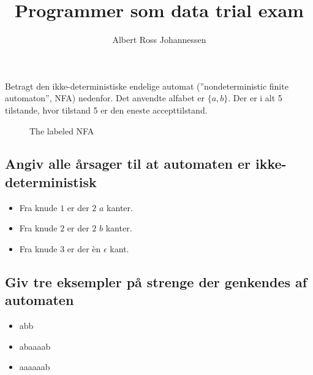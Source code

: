 \documentclass[11pt,a4paper]{article}
\begin{document}
\begin{titlepage}
  \title{Programmer som data trial exam}
  \author{Albert Ross Johannessen}
  \maketitle
  \newpage
  \thispagestyle{empty}
  \newpage
\end{titlepage}

\pagestyle{fancy}
\fancyhf{}
\newpage
\section{}
Betragt den ikke-deterministiske endelige automat (''nondeterministic finite automaton'', NFA) nedenfor. Det anvendte alfabet er $\lbrace a,b\rbrace$. Der er i alt 5 tilstande, hvor tilstand 5 er den eneste accepttilstand.
\begin{figure}[!ht]\label{fig:examfignfa}
    \centering
    \caption{The labeled NFA}
\end{figure}
\subsection{Angiv alle årsager til at automaten er ikke-deterministisk}
\begin{itemize}
  \item Fra knude $1$ er der $2$ $a$ kanter.
  \item Fra knude $2$ er der $2$ $b$ kanter.
  \item Fra knude $3$ er der èn $\epsilon$ kant.
\end{itemize}
\subsection{Giv tre eksempler på strenge der genkendes af automaten}
\begin{itemize}
  \item abb
  \item abaaaab
  \item aaaaaab
\end{itemize}
\end{document}

